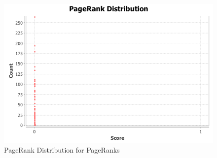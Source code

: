 \begin{figure}[!ht]    
    \begin{center}
        \includegraphics[scale=0.60]{q3/PageRank/pageranks.png}
        \caption{PageRank Distribution for PageRanks}
        \label{fig:q3-6}
    \end{center}
\end{figure}
\newpage

